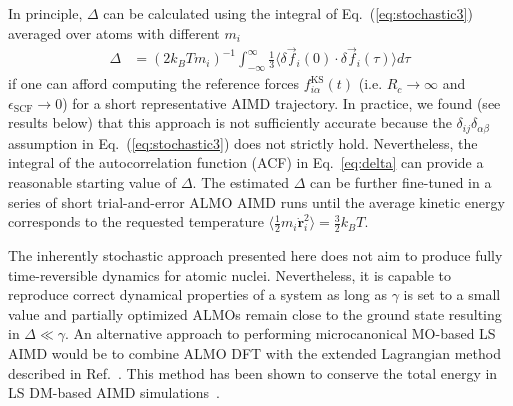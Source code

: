 \documentclass[aip,jcp,reprint,amsmath,amssymb]{revtex4-1}
\begin{document}
In principle, $\Delta$ can be calculated using the integral of Eq.~(\ref{eq:stochastic3}) averaged over atoms with different $m_i$
%
\begin{align}
\label{eq:delta}
\Delta &= (2 k_B T m_i )^{-1} \int_{-\infty}^{\infty} \frac{1}{3} \langle \delta \vec{f}_i (0) \cdot \delta\vec{f}_i(\tau) \rangle d\tau
\end{align}
%
if one can afford computing the reference forces $f^{\text{KS}}_{i\alpha}(t)$ (i.e. $R_c \rightarrow \infty$ and $\epsilon_{\text{SCF}} \rightarrow 0$) for a short representative AIMD trajectory. 
In practice, we found (see results below) that this approach is not sufficiently accurate because the $\delta_{ij}\delta_{\alpha\beta}$ assumption in Eq.~(\ref{eq:stochastic3}) does not strictly hold. 
Nevertheless, the integral of the autocorrelation function (ACF) in Eq.~\ref{eq:delta} can provide a reasonable starting value of $\Delta$. %
The estimated $\Delta$ can be further fine-tuned in a series of short trial-and-error ALMO AIMD runs until the average kinetic energy corresponds to the requested temperature $\langle \frac{1}{2} m_i \dot{\bm{r}}^{2}_{i} \rangle = \frac{3}{2} k_{B} T$. 

The inherently stochastic approach presented here does not aim to produce fully time-reversible dynamics for atomic nuclei. 
Nevertheless, it is capable to reproduce correct dynamical properties of a system as long as $\gamma$ is set to a small value and  partially optimized ALMOs remain close to the ground state resulting in $\Delta \ll \gamma$. 
An alternative approach to performing microcanonical MO-based LS AIMD would be to combine ALMO DFT with the extended Lagrangian method described in Ref.~. This method has been shown to conserve the total energy in LS DM-based AIMD simulations~\cite{Cawkwell2012}. 


\end{document}
